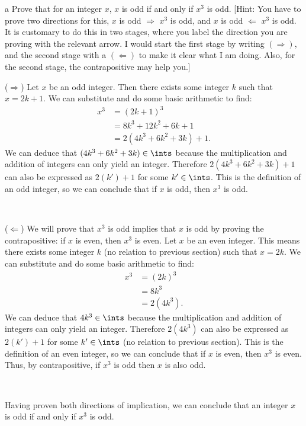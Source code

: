 \documentclass{article}
\begin{document}
\begin{problem} a
Prove that for an integer $x$, $x$ is odd if and only if $x^3$ is odd. [Hint: You have to prove two directions for this, $x$ is odd $\Rightarrow$ $x^3$ is odd, and $x$ is odd $\Leftarrow$ $x^3$ is odd. It is customary to do this in two stages, where you label the direction you are proving with the relevant arrow. I would start the first stage by writing $(\Rightarrow)$, and the second stage with a $(\Leftarrow)$ to make it clear what I am doing. Also, for the second stage, the contrapositive may help you.]
\end{problem}

($\Rightarrow$) Let $x$ be an odd integer. Then there exists some integer $k$ such that $x=2k+1$. We can substitute and do some basic arithmetic to find:
\begin{align*}
    x^3 &= (2k+1)^3 \\
    &= 8 k^3 + 12 k^2 + 6 k + 1 \\
    &= 2(4k^3+6k^2+3k)+1.
\end{align*}
We can deduce that $(4k^3+6k^2+3k) \in \ints$ because the multiplication and addition of integers can only yield an integer. Therefore $2(4k^3+6k^2+3k)+1$ can also be expressed as $2(k')+1$ for some $k' \in \ints$. This is the definition of an odd integer, so we can  conclude that if $x$ is odd, then $x^3$ is odd.

\

($\Leftarrow$) We will prove that $x^3$ is odd implies that $x$ is odd by proving the contrapositive: if $x$ is even, then $x^3$ is even. Let $x$ be an even integer. This means there exists some integer $k$ (no relation to previous section) such that $x=2k$. We can substitute and do some basic arithmetic to find:
\begin{align*}
    x^3 &= (2k)^3 \\
    &= 8k^3 \\
    &= 2(4k^3).
\end{align*}
We can deduce that $4k^3 \in \ints$ because the multiplication and addition of integers can only yield an integer. Therefore $2(4k^3)$ can also be expressed as $2(k')+1$ for some $k' \in \ints$ (no relation to previous section). This is the definition of an even integer, so we can  conclude that if $x$ is even, then $x^3$ is even. Thus, by contrapositive, if $x^3$ is odd then $x$ is also odd.

\

Having proven both directions of implication, we can conclude that an integer $x$ is odd if and only if $x^3$ is odd.
\end{document}
